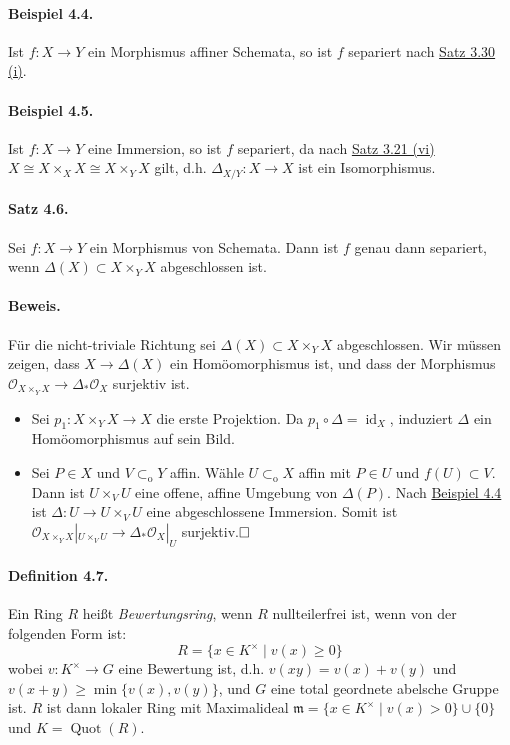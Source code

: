 \documentclass[11pt,b5paper,openany]{memoir}
\def \qed {$\hfill\square$}
\begin{document}
\paragraph{Beispiel 4.4.}\label{4.4} Ist $f:X\to Y$ ein Morphismus affiner Schemata, so ist $f$ separiert nach \hyperref[3.30]{Satz 3.30 (i)}.

\paragraph{Beispiel 4.5.}\label{4.5} Ist $f:X\to Y$ eine Immersion, so ist $f$ separiert, da nach \hyperref[3.21]{Satz 3.21 (vi)} $X\cong X\times_XX\cong X\times_YX$ gilt, d.h. $\Delta_{X/Y}:X\to X$ ist ein Isomorphismus.

\paragraph{Satz 4.6.}\label{4.6} Sei $f:X\to Y$ ein Morphismus von Schemata. Dann ist $f$ genau dann separiert, wenn $\Delta(X)\subset X\times_YX$ abgeschlossen ist.

\paragraph{Beweis.} Für die nicht-triviale Richtung sei $\Delta(X)\subset X\times_YX$ abgeschlossen. Wir müssen zeigen, dass $X\to \Delta(X)$ ein Homöomorphismus ist, und dass der Morphismus $\mathcal{O}_{X\times_YX}\to\Delta_\ast\mathcal{O}_X$ surjektiv ist.
\begin{itemize}
\item Sei $p_1:X\times_YX\to X$ die erste Projektion. Da $p_1\circ\Delta=\operatorname{id}_X$, induziert $\Delta$ ein Homöomorphismus auf sein Bild. 
\item Sei $P\in X$ und $V\subset_\text{o} Y$ affin. Wähle $U\subset_\text{o}X$ affin mit $P\in U$ und $f(U)\subset V$. Dann ist $U\times_VU$ eine offene, affine Umgebung von $\Delta(P)$. Nach \hyperref[4.4]{Beispiel 4.4} ist $\Delta:U\to U\times_VU$ eine abgeschlossene Immersion. Somit ist $\mathcal{O}_{X\times_YX}|_{U\times_VU}\to \Delta_\ast\mathcal{O}_X|_U$ surjektiv.\qed
\end{itemize}

\paragraph{Definition 4.7.}\label{4.7} Ein Ring $R$ heißt \textit{Bewertungsring}, wenn $R$ nullteilerfrei ist, wenn von der folgenden Form ist:
\[R=\{x\in K^\times\mid v(x)\geq 0\} \]
wobei $v:K^\times\to G$ eine Bewertung ist, d.h. $v(xy)=v(x)+v(y)$ und $v(x+y)\geq\min\{v(x),v(y)\}$, und $G$ eine total geordnete abelsche Gruppe ist. $R$ ist dann lokaler Ring mit Maximalideal $\mathfrak{m}=\{x\in K^\times\mid v(x)>0\}\cup\{0\}$ und $K=\operatorname{Quot}(R)$.
\end{document}
